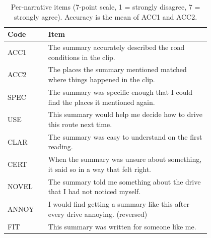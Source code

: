 \begin{table}[t]
\caption{Per-narrative items (7-point scale, 1 = strongly disagree, 7 = strongly agree). Accuracy is the mean of ACC1 and ACC2.}
\label{tab:items}
\small
\begin{tabular}{@{}lp{0.80\linewidth}@{}}
\toprule
Code & Item \\
\midrule
ACC1 & The summary accurately described the road conditions in the clip. \\
ACC2 & The places the summary mentioned matched where things happened in the clip. \\
SPEC & The summary was specific enough that I could find the places it mentioned again. \\
USE & This summary would help me decide how to drive this route next time. \\
CLAR & The summary was easy to understand on the first reading. \\
CERT & When the summary was unsure about something, it said so in a way that felt right. \\
NOVEL & The summary told me something about the drive that I had not noticed myself. \\
ANNOY & I would find getting a summary like this after every drive annoying. (reversed) \\
FIT & This summary was written for someone like me. \\
\bottomrule
\end{tabular}
\end{table}

